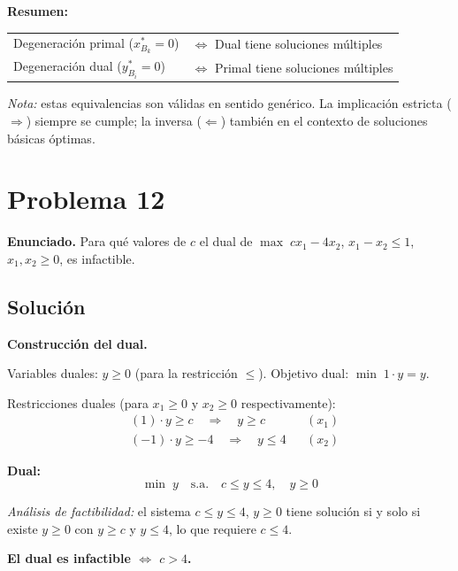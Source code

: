\documentclass{article}
\begin{document}
\textbf{Resumen:}
\begin{center}
\renewcommand{\arraystretch}{1.3}
\begin{tabular}{l|l}
\hline
Degeneración primal ($x_{B_k}^*=0$) & $\Longleftrightarrow$ Dual tiene soluciones múltiples\\
Degeneración dual ($y_{B_i}^*=0$) & $\Longleftrightarrow$ Primal tiene soluciones múltiples\\
\hline
\end{tabular}
\end{center}

\textit{Nota:} estas equivalencias son válidas en sentido genérico. La implicación estricta ($\Rightarrow$) siempre se cumple; la inversa ($\Leftarrow$) también en el contexto de soluciones básicas óptimas.

\newpage
\section*{Problema 12}

\textbf{Enunciado.} Para qué valores de $c$ el dual de $\max\;cx_1-4x_2$, $x_1-x_2\leq1$, $x_1,x_2\geq0$, es infactible.

\subsection*{Solución}

\textbf{Construcción del dual.}

Variables duales: $y\geq0$ (para la restricción $\leq$). Objetivo dual: $\min\;1\cdot y=y$.

Restricciones duales (para $x_1\geq0$ y $x_2\geq0$ respectivamente):
\begin{align*}
&(1)\cdot y \geq c \quad\Rightarrow\quad y\geq c &&(x_1)\\
&(-1)\cdot y \geq -4 \quad\Rightarrow\quad y\leq 4 &&(x_2)
\end{align*}

\textbf{Dual:}
$$\min\;y\quad\text{s.a.}\quad c\leq y\leq4,\quad y\geq0$$

\textit{Análisis de factibilidad:} el sistema $c\leq y\leq4$, $y\geq0$ tiene solución si y solo si existe $y\geq0$ con $y\geq c$ y $y\leq4$, lo que requiere $c\leq4$.

\textbf{El dual es infactible $\Longleftrightarrow$ $c>4$.}
\end{document}

